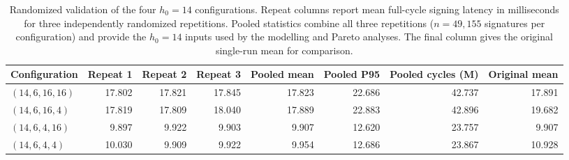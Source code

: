\begin{table}[t]
\centering
\caption{Randomized validation of the four $h_0=14$ configurations. Repeat columns report mean full-cycle signing latency in milliseconds for three independently randomized repetitions. Pooled statistics combine all three repetitions ($n=49{,}155$ signatures per configuration) and provide the $h_0=14$ inputs used by the modelling and Pareto analyses. The final column gives the original single-run mean for comparison.}
\label{tab:h14_randomized_validation}
\footnotesize
\setlength{\tabcolsep}{2.2pt}
\begin{tabular}{@{}lrrrrrrr@{}}
\toprule
Configuration & Repeat 1 & Repeat 2 & Repeat 3 & Pooled mean & Pooled P95 & Pooled cycles (M) & Original mean \\
\midrule
$(14,6,16,16)$ & 17.802 & 17.821 & 17.845 & 17.823 & 22.686 & 42.737 & 17.891 \\
$(14,6,16,4)$ & 17.819 & 17.809 & 18.040 & 17.889 & 22.883 & 42.896 & 19.682 \\
$(14,6,4,16)$ & 9.897 & 9.922 & 9.903 & 9.907 & 12.620 & 23.757 & 9.907 \\
$(14,6,4,4)$ & 10.030 & 9.909 & 9.922 & 9.954 & 12.686 & 23.867 & 10.928 \\
\bottomrule
\end{tabular}
\end{table}
